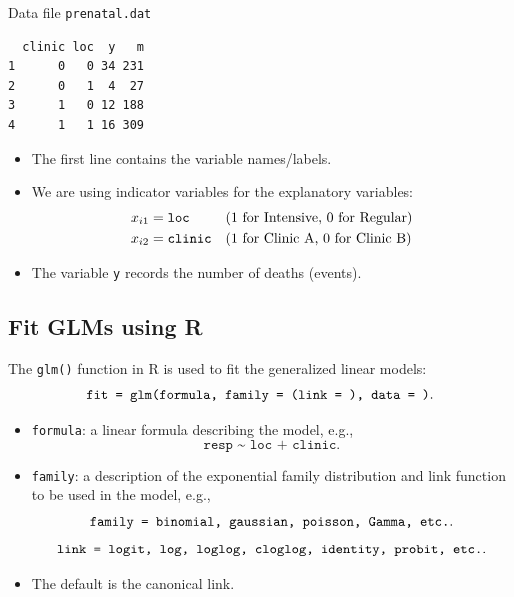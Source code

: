 \documentclass{article}\usepackage[]{graphicx}\usepackage[svgnames]{xcolor}
\makeatletter
\newenvironment{kframe}{%
 \def\at@end@of@kframe{}%
 \ifinner\ifhmode%
  \def\at@end@of@kframe{\end{minipage}}%
  \begin{minipage}{\columnwidth}%
 \fi\fi%
 \def\FrameCommand##1{\hskip\@totalleftmargin \hskip-\fboxsep
 \colorbox{shadecolor}{##1}\hskip-\fboxsep
     \hskip-\linewidth \hskip-\@totalleftmargin \hskip\columnwidth}%
 \MakeFramed {\advance\hsize-\width
   \@totalleftmargin\z@ \linewidth\hsize
   \@setminipage}}%
 {\par\unskip\endMakeFramed%
 \at@end@of@kframe}
\newenvironment{knitrout}{}{} %
\makeatother
\begin{document}
\begin{Example}{Data file \texttt{prenatal.dat}}
\begin{knitrout}
\color{fgcolor}\begin{kframe}
\begin{verbatim}
  clinic loc  y   m
1      0   0 34 231
2      0   1  4  27
3      1   0 12 188
4      1   1 16 309
\end{verbatim}
\end{kframe}
\end{knitrout}
      \begin{itemize}
            \item The first line contains the variable names/labels.
            \item We are using indicator variables for the explanatory variables:
                  \begin{align*}
                        x_{i1} & =\text{\texttt{loc}}    &  & \text{(1 for Intensive, 0 for Regular)} \\
                        x_{i2} & =\text{\texttt{clinic}} &  & \text{(1 for Clinic A, 0 for Clinic B)}
                  \end{align*}
            \item The variable \texttt{y} records the number of deaths (events).
      \end{itemize}
\end{Example}
\subsection*{Fit GLMs using R}
The \texttt{glm()} function in R is used to fit the generalized linear models:
\[ \text{\texttt{fit = glm(formula, family = (link = ), data = )}}. \]
\begin{itemize}
      \item \texttt{formula}: a linear formula describing the model, e.g.,
            \[ \texttt{resp \textasciitilde{} loc + clinic}. \]
      \item \texttt{family}: a description of the exponential family distribution and link
            function to be used in the model, e.g.,
            \[ \text{\texttt{family = binomial, gaussian, poisson, Gamma, etc.}}. \]
            \[ \text{\texttt{link = logit, log, loglog, cloglog, identity, probit, etc.}}. \]
      \item The default is the canonical link.
\end{itemize}
\end{document}

